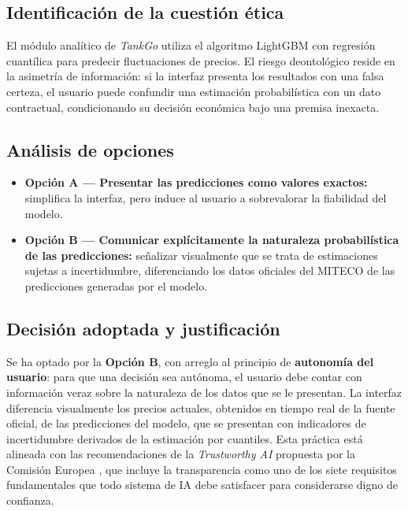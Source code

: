 \subsection{Identificación de la cuestión ética}

El módulo analítico de \textit{TankGo} utiliza el algoritmo LightGBM con regresión cuantílica para predecir fluctuaciones de precios. 
El riesgo deontológico reside en la asimetría de información: si la interfaz presenta los resultados con una falsa certeza, 
el usuario puede confundir una estimación probabilística con un dato contractual, condicionando su decisión económica 
bajo una premisa inexacta.

\subsection{Análisis de opciones}

\begin{itemize}
    \item \textbf{Opción A — Presentar las predicciones como valores exactos:} simplifica
          la interfaz, pero induce al usuario a sobrevalorar la fiabilidad del modelo.

    \item \textbf{Opción B — Comunicar explícitamente la naturaleza probabilística de las
              predicciones:} señalizar visualmente que se trata de estimaciones sujetas a incertidumbre,
          diferenciando los datos oficiales del MITECO \cite{datosgob_carburantes} de las
          predicciones generadas por el modelo.
\end{itemize}

\subsection{Decisión adoptada y justificación}

Se ha optado por la \textbf{Opción B}, con arreglo al principio de \textbf{autonomía
del usuario}: para que una decisión sea autónoma, el usuario debe contar con información
veraz sobre la naturaleza de los datos que se le presentan. La interfaz diferencia
visualmente los precios actuales, obtenidos en tiempo real de la fuente oficial, de las
predicciones del modelo, que se presentan con indicadores de incertidumbre derivados de
la estimación por cuantiles. Esta práctica está alineada con las recomendaciones de la
\textit{Trustworthy AI} propuesta por la Comisión Europea \cite{ec2019trustworthyai},
que incluye la transparencia como uno de los siete requisitos fundamentales que todo
sistema de IA debe satisfacer para considerarse digno de confianza.

